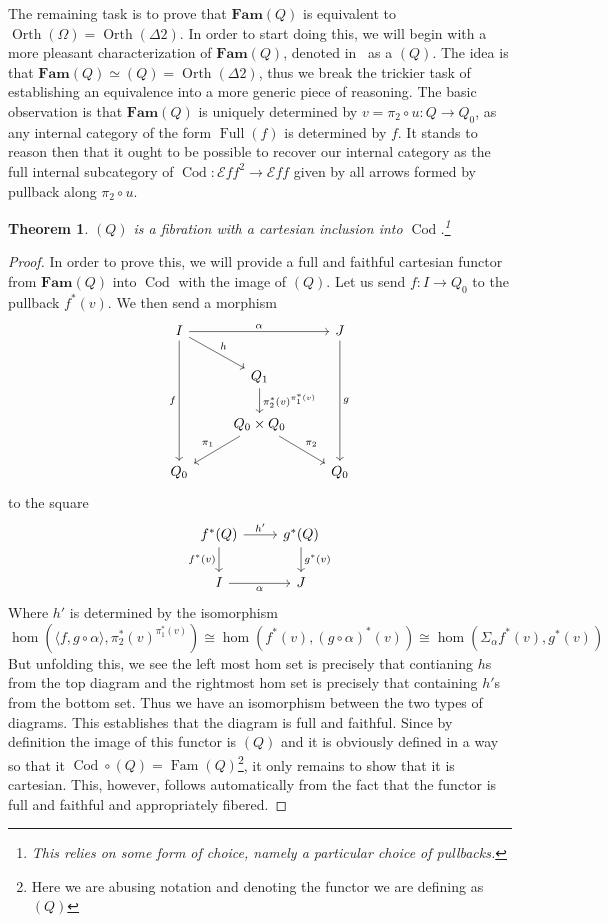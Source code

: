 \documentclass[12pt]{amsart}
\newcommand{\cat}[1]{\ensuremath{\mathbf{#1}}}
\newcommand{\eff}{\mathcal{E}\!f\!f}
\DeclareMathOperator{\cod}{Cod}
\DeclareMathOperator{\full}{Full}
\DeclareMathOperator{\family}{Fam}
\DeclareMathOperator{\orth}{Orth}
\newtheorem{thm}{Theorem}[section]
\begin{document}
The remaining task is to prove that $\cat{Fam}(Q)$ is equivalent to
$\orth(\Omega) = \orth(\Delta 2)$. In order to start doing this, we
will begin with a more pleasant characterization of $\cat{Fam}(Q)$,
denoted in~\citet{Hyland:90} as a $(Q)$. The idea is that
$\cat{Fam}(Q) \simeq (Q) = \orth(\Delta 2)$, thus we break the
trickier task of establishing an equivalence into a more generic piece
of reasoning. The basic observation is that $\cat{Fam}(Q)$ is uniquely
determined by $v = \pi_2 \circ u : Q \to Q_0$, as any internal category of
the form $\full(f)$ is determined by $f$. It stands to reason then
that it ought to be possible to recover our internal category as the
full internal subcategory of $\cod : \eff^2 \to \eff$ given by all
arrows formed by pullback along $\pi_2 \circ u$.
\begin{thm}\label{thm:orth:altexternalization}
  $(Q)$ is a fibration with a cartesian inclusion into
  $\cod$.\footnote{This relies on some form of choice, namely a
    particular choice of pullbacks.}
\end{thm}
\begin{proof}
  In order to prove this, we will provide a full and faithful
  cartesian functor from $\cat{Fam}(Q)$ into $\cod$ with the image of
  $(Q)$. Let us send $f : I \to Q_0$ to the pullback $f^*(v)$. We then
  send a morphism
  \[
    \begin{tikzcd}
      I \ar[ddd, swap, "f"] \ar[rd, "h"] \ar[rr, "\alpha"] && J \ar[ddd, "g"]\\
      & Q_1 \ar[d, "\pi_2^*(v)^{\pi_1^*(v)}"] &\\
      & {Q_0 \times Q_0} \ar[dl, swap, "\pi_1"] \ar[dr, "\pi_2"]&\\
      Q_0 && Q_0
    \end{tikzcd}
  \]
  to the square
  \[
    \begin{tikzcd}
      f^*(Q) \ar[d, swap, "f^*(v)"] \ar[r, "h'"] & g^*(Q) \ar[d, "g^*(v)"]\\
      I \ar[r, swap, "\alpha"] & J
    \end{tikzcd}
  \]
  Where $h'$ is determined by the isomorphism
  \[
    \hom(\langle f, g \circ \alpha \rangle, \pi_2^*(v)^{\pi_1^*(v)}) \cong
    \hom(f^*(v), (g \circ \alpha)^*(v)) \cong
    \hom(\Sigma_\alpha f^*(v), g^*(v))
  \]
  But unfolding this, we see the left most hom set is precisely that
  contianing $h$s from the top diagram and the rightmost hom set is
  precisely that containing $h'$s from the bottom set. Thus we have an
  isomorphism between the two types of diagrams. This establishes that
  the diagram is full and faithful. Since by definition the image of
  this functor is $(Q)$ and it is obviously defined in a way so that
  it $\cod \circ (Q) = \family(Q)$\footnote{Here we are abusing
    notation and denoting the functor we are defining as $(Q)$}, it
  only remains to show that it is cartesian. This, however, follows
  automatically from the fact that the functor is full and faithful
  and appropriately fibered.
\end{proof}
\end{document}
